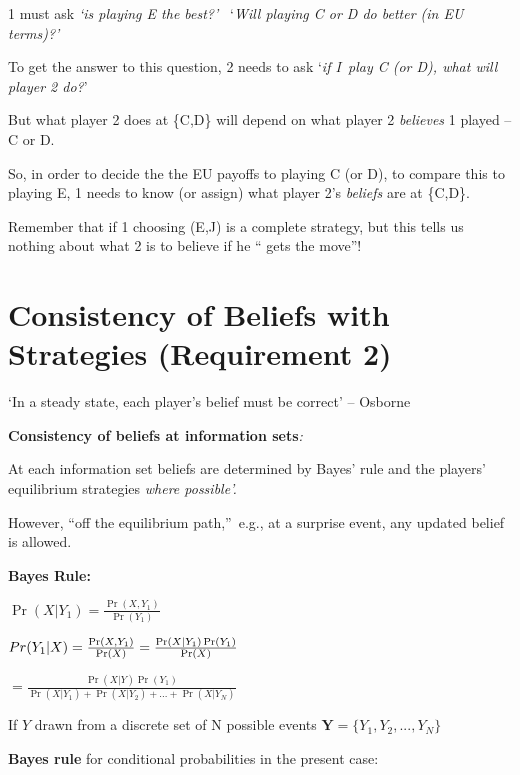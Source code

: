 \documentclass{article}
\begin{document}
1 must ask \textit{`is playing E the best?'} \ `\textit{Will playing C or D
do better (in EU terms)?'}

To get the answer to this question, 2 needs to ask `\textit{if I\ play C (or
D), what will player 2 do?}'

\bigskip 

But what player 2 does at \{C,D\} will depend on what player 2 \textit{%
believes }1 played -- C or D.

So, in order to decide the the EU payoffs to playing C (or D), to compare
this to playing E, 1 needs to know (or assign) what player 2's \textit{%
beliefs }are at \{C,D\}. 

{\footnotesize Remember that if 1 choosing (E,J) is a complete strategy, but
this tells us nothing about what 2 is to believe if he \textquotedblleft
gets the move\textquotedblright !}

\bigskip 

\section{Consistency of Beliefs with Strategies (Requirement 2)}

`In a steady state, each player's belief must be correct' -- Osborne

\bigskip 

\textbf{Consistency of beliefs at information sets}\textit{:}

At each information set beliefs are determined by Bayes' rule and the
players' equilibrium strategies \textit{where possible'.}

However, \textquotedblleft off the equilibrium path,\textquotedblright\
e.g., at a surprise event, any updated belief is allowed.\bigskip 

\textbf{Bayes Rule:}

$\Pr (X|Y_{1})=\frac{\Pr (X,Y_{1})}{\Pr (Y_{1})}$

\bigskip 

$Pr(Y_{1}|X)=\frac{\Pr (X,Y_{1})}{\Pr (X)}=\frac{\Pr (X|Y_{1})\Pr (Y_{1})}{%
\Pr (X)}$

$=\frac{\Pr (X|Y)\Pr (Y_{1})}{\Pr (X|Y_{1})+\Pr (X|Y_{2})+...+\Pr (X|Y_{N})}$

\bigskip 

If $Y$ drawn from a discrete set of N possible events $\mathbf{Y=}%
\{Y_{1},Y_{2},...,Y_{N}\}$

\bigskip 

\textbf{Bayes rule} for conditional probabilities in the present case:
\end{document}
